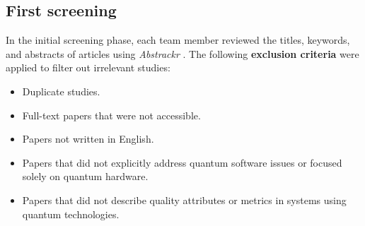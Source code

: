 



\subsection{First screening}

In the initial screening phase, each team member reviewed the titles, keywords, and abstracts of articles using \textit{Abstrackr} \cite{Cerezo2022}. The following \textbf{exclusion criteria} were applied to filter out irrelevant studies:
\begin{itemize}
  \item Duplicate studies.
  \item Full-text papers that were not accessible.
  \item Papers not written in English.
  \item Papers that did not explicitly address quantum software issues or focused solely on quantum hardware.
  \item Papers that did not describe quality attributes or metrics in systems using quantum technologies.
\end{itemize}

